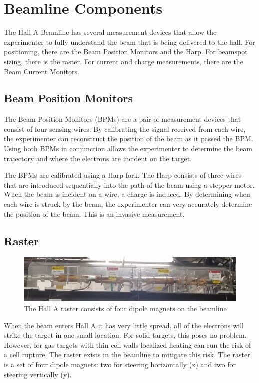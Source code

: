 \section{Beamline Components}

The Hall A Beamline has several measurement devices that allow the experimenter to fully understand the beam that is being delivered to the hall. For positioning, there are the Beam Position Monitors and the Harp. For beamspot sizing, there is the raster. For current and charge measurements, there are the Beam Current Monitors.

\subsection{Beam Position Monitors}

The Beam Position Monitors (BPMs) are a pair of measurement devices that consist of four sensing wires. By calibrating the signal received from each wire, the experimenter can reconstruct the position of the beam as it passed the BPM. Using both BPMs in conjunction allows the experimenter to determine the beam trajectory and where the electrons are incident on the target.

The BPMs are calibrated using a Harp fork. The Harp consists of three wires that are introduced sequentially into the path of the beam using a stepper motor. When the beam is incident on a wire, a charge is induced. By determining when each wire is struck by the beam, the experimenter can very accurately determine the position of the beam. This is an invasive measurement.

\subsection{Raster}
\begin{figure}
	\includegraphics[width=\linewidth]{./chap2-exp/fig/raster_pic.jpg}
	\caption{The Hall A raster consists of four dipole magnets on the beamline}
	\label{fig:rasterpic}
\end{figure}

When the beam enters Hall A it has very little spread, all of the electrons will strike the target in one small location. For solid targets, this poses no problem. However, for gas targets with thin cell walls localized heating can run the risk of a cell rupture. The raster exists in the beamline to mitigate this risk. The raster is a set of four dipole magnets: two for steering horizontally (x) and two for steering vertically (y).

